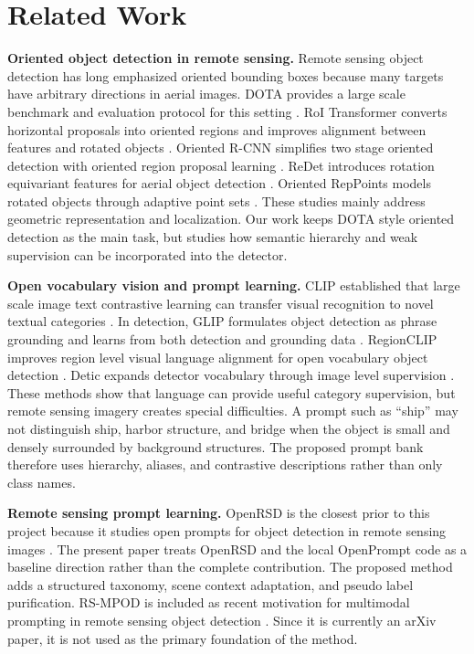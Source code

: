 \documentclass[10pt]{article}
\begin{document}
\section{Related Work}

\textbf{Oriented object detection in remote sensing.}
Remote sensing object detection has long emphasized oriented bounding boxes because many targets have arbitrary directions in aerial images. DOTA provides a large scale benchmark and evaluation protocol for this setting \cite{xia2018dota}. RoI Transformer converts horizontal proposals into oriented regions and improves alignment between features and rotated objects \cite{ding2019roit}. Oriented R-CNN simplifies two stage oriented detection with oriented region proposal learning \cite{xie2021orientedrcnn}. ReDet introduces rotation equivariant features for aerial object detection \cite{han2021redet}. Oriented RepPoints models rotated objects through adaptive point sets \cite{li2022orientedreppoints}. These studies mainly address geometric representation and localization. Our work keeps DOTA style oriented detection as the main task, but studies how semantic hierarchy and weak supervision can be incorporated into the detector.

\textbf{Open vocabulary vision and prompt learning.}
CLIP established that large scale image text contrastive learning can transfer visual recognition to novel textual categories \cite{radford2021clip}. In detection, GLIP formulates object detection as phrase grounding and learns from both detection and grounding data \cite{li2022glip}. RegionCLIP improves region level visual language alignment for open vocabulary object detection \cite{zhong2022regionclip}. Detic expands detector vocabulary through image level supervision \cite{zhou2022detic}. These methods show that language can provide useful category supervision, but remote sensing imagery creates special difficulties. A prompt such as ``ship'' may not distinguish ship, harbor structure, and bridge when the object is small and densely surrounded by background structures. The proposed prompt bank therefore uses hierarchy, aliases, and contrastive descriptions rather than only class names.

\textbf{Remote sensing prompt learning.}
OpenRSD is the closest prior to this project because it studies open prompts for object detection in remote sensing images \cite{huang2025openrsd}. The present paper treats OpenRSD and the local OpenPrompt code as a baseline direction rather than the complete contribution. The proposed method adds a structured taxonomy, scene context adaptation, and pseudo label purification. RS-MPOD is included as recent motivation for multimodal prompting in remote sensing object detection \cite{rsmpod2026}. Since it is currently an arXiv paper, it is not used as the primary foundation of the method.
\end{document}
